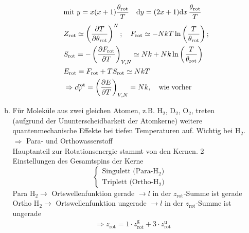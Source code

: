 \begin{enumerate}[A)]
\begin{enumerate}[a)]
\begin{enumerate}[i)]
\begin{equation}
\begin{split}
                    & \text{mit } y = x(x+1) \frac{\theta_\text{rot}}{T} \quad \mathrm{d} y = (2x+1)\mathrm{d} x \, \frac{\theta_\text{rot}}{T}
                \end{split}
            \end{equation}
            \begin{equation}
                \begin{split}
                    & Z_\text{rot} \simeq \left( \frac{\partial T}{\partial \theta_\text{rot}} \right)_{}^N; \quad F_\text{rot} \simeq - N k T \ln \left( \frac{T}{\theta_\text{rot}} \right); \\
                    & S_\text{rot} = - \left( \frac{\partial F_\text{rot}}{\partial T} \right)_{V, N} \simeq N k + Nk \ln \left( \frac{T}{\theta_\text{rot}} \right) \\
                    & E_\text{rot} = F_\text{rot} + T S_\text{rot} \simeq N k T \\
                    & \Rightarrow c_V^\text{rot} = \left( \frac{\partial E}{\partial T} \right)_{V, N} = N k, \quad \text{wie vorher}
                \end{split}
            \end{equation}
        \end{enumerate}
        \item Für Moleküle aus zwei gleichen Atomen, z.B. H$_2$, D$_2$, O$_2$, treten (aufgrund der Ununterscheidbarkeit der Atomkerne) weitere
        quantenmechanische Effekte bei tiefen Temperaturen auf. Wichtig bei H$_2$. \\
        $\Rightarrow$ Para- und Orthowasserstoff \\
        Hauptanteil zur Rotationsenergie stammt von den Kernen. 2 Einstellungen des Gesamtspins der Kerne
        \begin{equation}
            \begin{cases}
                \text{Singulett (Para-H$_2$)} \\
                \text{Triplett (Ortho-H$_2$)}
            \end{cases}
        \end{equation}
        Para H$_2 \rightarrow$ Ortswellenfunktion gerade $\rightarrow l$ in der $z_\text{rot}$-Summe ist gerade \\
        Ortho H$_2 \rightarrow$ Ortswellenfunktion ungerade $\rightarrow l$ in der $z_\text{rot}$-Summe ist ungerade
        \begin{equation}
            \begin{split}
                & \Rightarrow z_\text{rot} = 1 \cdot z_\text{rot}^\text{g} + 3 \cdot z_\text{rot}^\text{u} \\

\end{split}
\end{equation}
\end{enumerate}
\end{enumerate}
